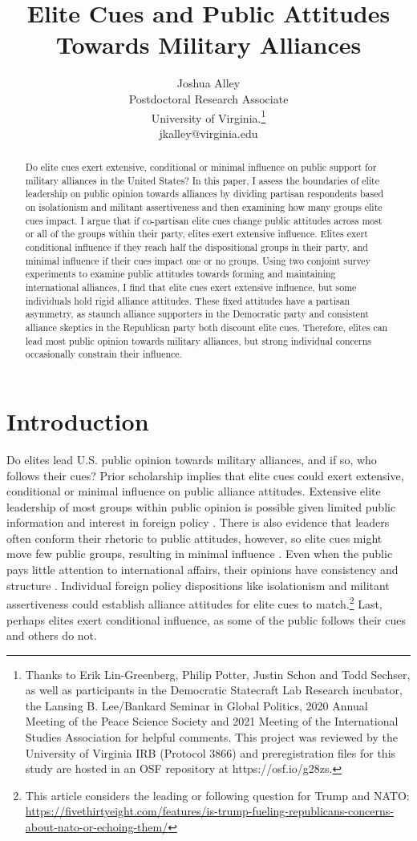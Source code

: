 \documentclass[12pt]{article}
\title{\textbf{Elite Cues and Public Attitudes Towards Military Alliances}}
\author{Joshua Alley \\
Postdoctoral Research Associate \\
University of Virginia.\thanks{Thanks to Erik Lin-Greenberg, Philip Potter, Justin Schon and Todd Sechser, as well as participants in the Democratic Statecraft Lab Research incubator, the Lansing B. Lee/Bankard Seminar in Global Politics, 2020 Annual Meeting of the Peace Science Society and 2021 Meeting of the International Studies Association for helpful comments. 
This project was reviewed by the University of Virginia IRB (Protocol 3866) and preregistration files for this study are hosted in an OSF repository at https://osf.io/g28zs.} \\
jkalley@virginia.edu
}
\date{}
\begin{document}
\maketitle 

\doublespace 

\begin{abstract}
Do elite cues exert extensive, conditional or minimal influence on public support for military alliances in the United States? 
In this paper, I assess the boundaries of elite leadership on public opinion towards alliances by dividing partisan respondents based on isolationism and militant assertiveness and then examining how many groups elite cues impact. 
I argue that if co-partisan elite cues change public attitudes across most or all of the groups within their party, elites exert extensive influence. 
Elites exert conditional influence if they reach half the dispositional groups in their party, and minimal influence if their cues impact one or no groups.
Using two conjoint survey experiments to examine public attitudes towards forming and maintaining international alliances, I find that elite cues exert extensive influence, but some individuals hold rigid alliance attitudes. 
These fixed attitudes have a partisan asymmetry, as staunch alliance supporters in the Democratic party and consistent alliance skeptics in the Republican party both discount elite cues.  
Therefore, elites can lead most public opinion towards military alliances, but strong individual concerns occasionally constrain their influence.  
\end{abstract}


\newpage 


\section{Introduction}


Do elites lead U.S. public opinion towards military alliances, and if so, who follows their cues?
Prior scholarship implies that elite cues could exert extensive, conditional or minimal influence on public alliance attitudes.
Extensive elite leadership of most groups within public opinion is possible given limited public information and interest in foreign policy \citep{Canes-Wrone2006, BaumPotter2008, Druckman2014}.
There is also evidence that leaders often conform their rhetoric to public attitudes, however, so elite cues might move few public groups, resulting in minimal influence \citep{Barberaetal2019, HagerHilbig2020}.
Even when the public pays little attention to international affairs, their opinions have consistency and structure \citep{Holsti1992, PageShapiro1992}.
Individual foreign policy dispositions like isolationism and militant assertiveness \citep{Herrmannetal1999, KertzerZeitzoff2017} could establish alliance attitudes for elite cues to match.\footnote{This article considers the leading or following question for Trump and NATO: \url{https://fivethirtyeight.com/features/is-trump-fueling-republicans-concerns-about-nato-or-echoing-them/}}
Last, perhaps elites exert conditional influence, as some of the public follows their cues and others do not. 
\end{document}

